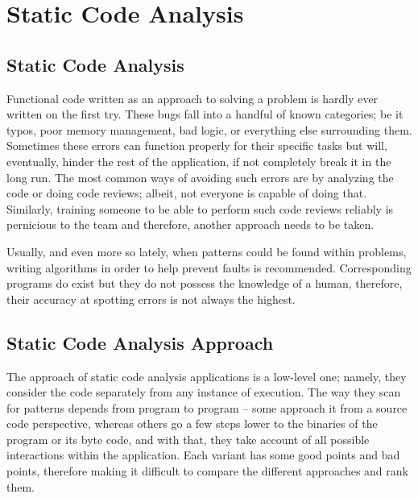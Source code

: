 

\chapter{Static Code Analysis}\label{chapter:chap2}


\section{Static Code Analysis}\label{sect:Static Code Analysis}

Functional code written as an approach to solving a problem is hardly ever written on the first try. These bugs fall into a handful of known categories; be it typos, poor memory management, bad logic, or everything else surrounding them. Sometimes these errors can function properly for their specific tasks but will, eventually, hinder the rest of the application, if not completely break it in the long run. The most common ways of avoiding such errors are by analyzing the code or doing code reviews; albeit, not everyone is capable of doing that. Similarly, training someone to be able to perform such code reviews reliably is pernicious to the team and therefore, another approach needs to be taken. \newline

\noindent Usually, and even more so lately, when patterns could be found within problems, writing algorithms in order to help prevent faults is recommended. Corresponding programs do exist but they do not possess the knowledge of a human, therefore, their accuracy at spotting errors is not always the highest.






\section{Static Code Analysis Approach}\label{sect:approach}

The approach of static code analysis applications is a low-level one; namely, they consider the code separately from any instance of execution. The way they scan for patterns depends from program to program -- some approach it from a source code perspective, whereas others go a few steps lower to the binaries of the program or its byte code, and with that, they take account of all possible interactions within the application. Each variant has some good points and bad points, therefore making it difficult to compare the different approaches and rank them. \newline

